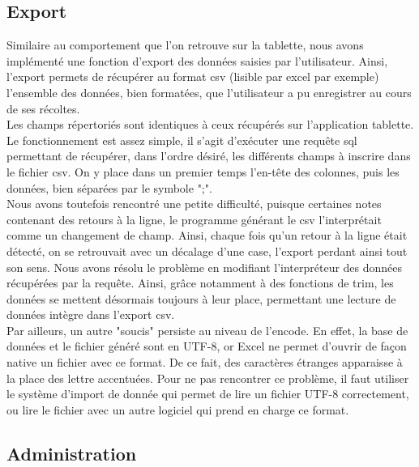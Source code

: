 \documentclass[twoside]{EPURapport}
\begin{document}
		\subsection{Export}
		
	Similaire au comportement que l'on retrouve sur la tablette, nous avons implémenté une fonction d'export des données saisies par l'utilisateur. Ainsi, l'export permets de récupérer au format csv (lisible par excel par exemple) l'ensemble des données, bien formatées, que l'utilisateur a pu enregistrer au cours de ses récoltes.\\
	
	Les champs répertoriés sont identiques à ceux récupérés sur l'application tablette.\\
	
	Le fonctionnement est assez simple, il s'agit d'exécuter une requête sql permettant de récupérer, dans l'ordre désiré, les différents champs à inscrire dans le fichier csv. On y place dans un premier temps l'en-tête des colonnes, puis les données, bien séparées par le symbole ";".\\
	
	Nous avons toutefois rencontré une petite difficulté, puisque certaines notes contenant des retours à la ligne, le programme générant le csv l'interprétait comme un changement de champ. Ainsi, chaque fois qu'un retour à la ligne était détecté, on se retrouvait avec un décalage d'une case, l'export perdant ainsi tout son sens. Nous avons résolu le problème en modifiant l'interpréteur des données récupérées par la requête. Ainsi, grâce notamment à des fonctions de trim, les données se mettent désormais toujours à leur place, permettant une lecture de données intègre dans l'export csv.\\
	
	Par ailleurs, un autre "soucis" persiste au niveau de l'encode. En effet, la base de données et le fichier généré sont en UTF-8, or Excel ne permet d'ouvrir de façon native un fichier avec ce format. De ce fait, des caractères étranges apparaisse à la place des lettre accentuées. Pour ne pas rencontrer ce problème, il faut utiliser le système d'import de donnée qui permet de lire un fichier UTF-8 correctement, ou  lire le fichier avec un autre logiciel qui prend en charge ce format.
		
		\subsection{Administration}
		
\end{document}
